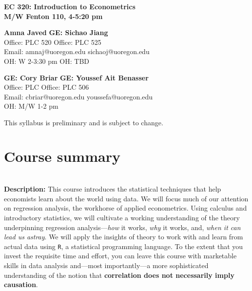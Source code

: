 \documentclass[11pt]{article}
\begin{document}
\begin{center}
\textbf{\Large EC 320: Introduction to Econometrics\\
M/W Fenton 110, 4-5:20 pm }
\end{center}

\vspace{0.2in}

 \textbf{\large Amna Javed }
  \hfill  
 \textbf{ \large GE: Sichao Jiang} \\  
 \large Office: PLC 520
 \hfill 
 \large Office: PLC 525\\
  \large Email: amnaj@uoregon.edu 
 \hfill 
 \large sichaoj@uoregon.edu \\ 
 \large OH: W 2-3:30 pm 
 \hfill 
  \large OH: TBD

\bigskip

 \textbf{\large GE: Cory Briar}
  \hfill  
 \textbf{ \large GE: Youssef Ait Benasser} \\  
 \large Office: PLC 
 \hfill 
 \large Office: PLC 506\\
  \large Email:  cbriar@uoregon.edu
 \hfill 
 \large   youssefa@uoregon.edu \\ 
 \large OH: M/W 1-2 pm
 \hfill 
 
\vspace{5mm}

\begin{center}  This syllabus is preliminary and is subject to change.  \\
\end{center}


\section*{Course summary}

\textbf {\large \\ Description:} This course introduces the statistical techniques that help economists learn about the world using data. We will focus much of our attention on regression analysis, the workhorse of applied econometrics. Using calculus and introductory statistics, we will cultivate a working understanding of the theory underpinning regression analysis---\textit{how} it works, \textit{why} it works, and, \textit{when it can lead us astray}. We will apply the insights of theory to work with and learn from actual data using \texttt{{R}}, a statistical programming language. To the extent that you invest the requisite time and effort, you can leave this course with marketable skills in data analysis and---most importantly---a more sophisticated understanding of the notion that \textbf{correlation does not necessarily imply causation}. 
\end{document}
